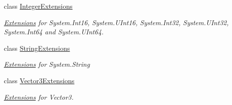 \begin{DoxyCompactItemize}
class \hyperlink{class_tri_devs_1_1_tri_engine_1_1_extensions_1_1_integer_extensions}{Integer\-Extensions}
\begin{DoxyCompactList}\small\item\em \hyperlink{namespace_tri_devs_1_1_tri_engine_1_1_extensions}{Extensions} for System.\-Int16, System.\-U\-Int16, System.\-Int32, System.\-U\-Int32, System.\-Int64 and System.\-U\-Int64. \end{DoxyCompactList}\item 
class \hyperlink{class_tri_devs_1_1_tri_engine_1_1_extensions_1_1_string_extensions}{String\-Extensions}
\begin{DoxyCompactList}\small\item\em \hyperlink{namespace_tri_devs_1_1_tri_engine_1_1_extensions}{Extensions} for System.\-String \end{DoxyCompactList}\item 
class \hyperlink{class_tri_devs_1_1_tri_engine_1_1_extensions_1_1_vector3_extensions}{Vector3\-Extensions}
\begin{DoxyCompactList}\small\item\em \hyperlink{namespace_tri_devs_1_1_tri_engine_1_1_extensions}{Extensions} for Vector3. \end{DoxyCompactList}\end{DoxyCompactItemize}
